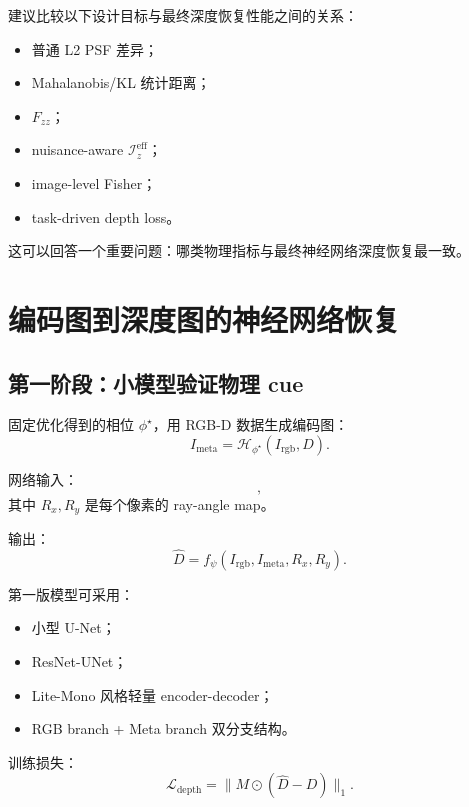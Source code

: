 \documentclass[11pt,a4paper,fontset=none]{ctexart}
\begin{document}
建议比较以下设计目标与最终深度恢复性能之间的关系：
\begin{itemize}
  \item 普通 L2 PSF 差异；
  \item Mahalanobis/KL 统计距离；
  \item $F_{zz}$；
  \item nuisance-aware $\mathcal I_z^{\mathrm{eff}}$；
  \item image-level Fisher；
  \item task-driven depth loss。
\end{itemize}

这可以回答一个重要问题：哪类物理指标与最终神经网络深度恢复最一致。

\section{编码图到深度图的神经网络恢复}

\subsection{第一阶段：小模型验证物理 cue}

固定优化得到的相位 $\phi^\star$，用 RGB-D 数据生成编码图：
\begin{equation}
  I_{\mathrm{meta}}
  =
  \mathcal H_{\phi^\star}(I_{\mathrm{rgb}},D).
\end{equation}

网络输入：
\begin{equation}
  [I_{\mathrm{rgb}},I_{\mathrm{meta}},R_x,R_y],
\end{equation}
其中 $R_x,R_y$ 是每个像素的 ray-angle map。

输出：
\begin{equation}
  \hat D=f_\psi(I_{\mathrm{rgb}},I_{\mathrm{meta}},R_x,R_y).
\end{equation}

第一版模型可采用：
\begin{itemize}
  \item 小型 U-Net；
  \item ResNet-UNet；
  \item Lite-Mono 风格轻量 encoder-decoder；
  \item RGB branch + Meta branch 双分支结构。
\end{itemize}

训练损失：
\begin{equation}
  \mathcal L_{\mathrm{depth}}
  =
  \|M\odot(\hat D-D)\|_1.
\end{equation}
\end{document}
